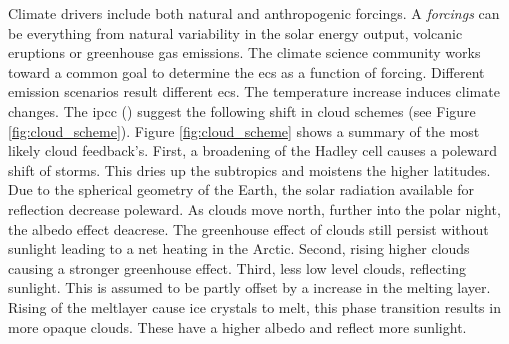 Climate drivers include both natural and anthropogenic forcings. A \textit{forcings} can be everything from natural variability in the solar energy output, volcanic eruptions or greenhouse gas emissions. The climate science community works toward a common goal to determine the \acrshort{ecs} as a function of forcing. Different emission scenarios result different \acrshort{ecs}. The temperature increase induces climate changes. The \acrshort{ipcc} (\cite{IPCC_CH7_clouds}) suggest the following shift in cloud schemes (see Figure \ref{fig:cloud_scheme}). Figure \ref{fig:cloud_scheme} shows a summary of the most likely cloud feedback's. First, a broadening of the Hadley cell causes a poleward shift of storms. This dries up the subtropics and moistens the higher latitudes. Due to the spherical geometry of the Earth, the solar radiation available for reflection decrease poleward. %
As clouds move north, further into the polar night, the albedo effect deacrese. The greenhouse effect of clouds still persist without sunlight leading to a net heating in the Arctic. Second, rising higher clouds causing a stronger greenhouse effect. Third, less low level clouds, reflecting sunlight. This is assumed to be partly offset by a increase in the melting layer. Rising of the meltlayer cause ice crystals to melt, this phase transition results in more opaque clouds. These have a higher albedo and reflect more sunlight. 